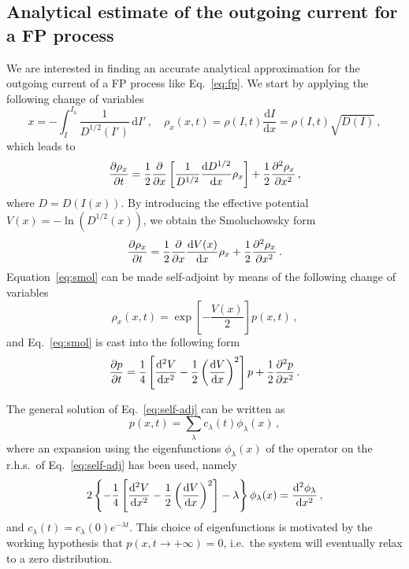 {\begin{chapterappendices}

\section{Analytical estimate of the outgoing current for a FP process}
\label{app_sec:analytic_estimate_of_the_current_loss}


We are interested in finding an accurate analytical approximation for the outgoing current of a FP process like Eq.~\eqref{eq:fp}. We start  by applying the following change of variables
\begin{equation}
    x = -\int_I^{I_\mathrm{a}} \frac{1}{D^{1/2}(I')}\,\mathrm{d}I'\,,\quad \rho_x(x,t)=\rho(I,t)\frac{\mathrm{d}I}{\mathrm{d}x}=\rho(I,t)\sqrt{D(I)} \, ,
\end{equation}
which leads to
\begin{equation}
    \pdv{\rho_x}{t} = \frac{1}{2}\pdv{x} \left[\frac{1}{D^{1/2}}\dv{D^{1/2}}{x}\rho_x\right]+\frac{1}{2}\pdv[2]{\rho_x}{x}\, ,
\end{equation}
where $D=D\left(I(x)\right)$. By introducing the effective potential $V(x)=-\ln(D^{1/2}(x))$, we obtain the Smoluchowsky form~\cite{hannes1996fokker}
\begin{equation}
    \pdv{\rho_x}{t} = \frac{1}{2}\pdv{x} \dv{V(x)}{x} \rho_x+\frac{1}{2}\pdv[2]{\rho_x}{x}\, .
    \label{eq:smol}
\end{equation}
Equation~\eqref{eq:smol} can be made self-adjoint by means of the following change of variables 
\begin{equation}
    \rho_x(x,t) = \exp\left[-\frac{V(x)}{2}\right]p(x,t) \, ,
\end{equation}
and Eq.~\eqref{eq:smol} is cast into the following form
\begin{equation}
    \pdv{p}{t} = \frac{1}{4}\left[\dv[2]{V}{x} - \frac{1}{2}\left(\dv{V}{x}\right)^2\right]p + \frac{1}{2}\pdv[2]{p}{x}\,.
    \label{eq:self-adj}
\end{equation}

The general solution of Eq.~\eqref{eq:self-adj} can be written as
\begin{equation}
    p(x,t) = \sum_\lambda c_\lambda(t)\phi_\lambda(x)\,,
    \label{eq:expansion}
\end{equation}
where an expansion using the eigenfunctions $\phi_\lambda(x)$ of the operator on the r.h.s.\ of Eq.~\eqref{eq:self-adj} has been used, namely 
\begin{equation}
    2\left\{-\frac{1}{4}\left[\dv[2]{V}{x} - \frac{1}{2}\left(\dv{V}{x}\right)^2\right] - \lambda \right\}\phi_\lambda(x) = \dv[2]{\phi_\lambda}{x}\,,
    \label{eq:eigenproblem}
\end{equation}
and $c_\lambda(t) = c_\lambda(0)e^{-\lambda t}$. This choice of eigenfunctions is motivated by the working hypothesis that $p(x,t\to+\infty)=0$, i.e.\ the system will eventually relax to a zero distribution.


\end{chapterappendices}}
